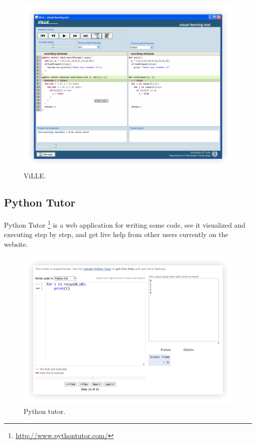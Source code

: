 \documentclass[]{usiinfbachelorproject}
\begin{document}
\begin{figure}[h!]
\centering
\includegraphics[scale=0.2]{figures/ville.png}
\caption {ViLLE.}
\end{figure}

\subsection{Python Tutor}

Python Tutor \footnote{\url{http://www.pythontutor.com/}} is a web application for writing some code, see it visualized and executing step by step, and get live help from other users currently on the website.

\begin{figure}[h!]
\centering
\includegraphics[scale=0.177]{figures/python_tutor}
\caption {Python tutor.}
\end{figure}
\end{document}
